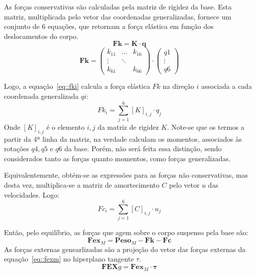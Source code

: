 As forças conservativas são calculadas pela matriz de rigidez da base. Esta
matriz, multiplicada pelo vetor das coordenadas generalizadas, fornece um
conjunto de 6 equações, que retornam a força elástica em função dos
deslocamentos do corpo.
%
\begin{equation}
	\mathbf{Fk} = \mathbf{K} \cdot \mathbf{q}
\end{equation}
\begin{equation}
	\mathbf{Fk} = \begin{pmatrix} 
    k_{11} & \dots 	& k_{16} \\
    \vdots & \ddots & \\
    k_{61} &        & k_{66} 
    \end{pmatrix} \cdot 
    \begin{pmatrix} 
    q1 \\ 
    \vdots \\ 
    q6 
    \end{pmatrix}
\end{equation}


Logo, a equação~\ref{eq::fki} calcula a força elástica $Fk$ na direção $i$
associada a cada coordenada generalizada $qi$:
%
\begin{equation} \label{eq::fki}
	Fk_i = \sum_{j=1}^{6} [K]_{i,j} \cdot q_j
\end{equation}
%
Onde $[K]_{i,j}$ é o elemento $i,j$ da matriz de rigidez $K$. Note-se que os
termos a partir da 4ª linha da matriz, na verdade calculam os momentos,
associados às rotações $q4, q5$ e $q6$ da base.
Porém, não será feita essa distinção, sendo considerados tanto as forças quanto
momentos, como forças generalizadas.

Equivalentemente, obtém-se as expressões para as forças não conservativas, mas
desta vez, multiplica-se a matriz de amortecimento $C$ pelo vetor $u$ das
velocidades. Logo:
%
\begin{equation} \label{eq::fci}
	Fc_i = \sum_{j=1}^{6} [C]_{i,j} \cdot u_j
\end{equation}
%

Então, pelo equilíbrio, as forças que agem sobre o corpo suspenso pela base são:
%
\begin{equation} \label{eq::fexm}
	\mathbf{Fex}_M = \mathbf{Peso}_M - \mathbf{Fk} - \mathbf{Fc}
\end{equation}
%
As forças externas genearlizadas são a projeção do vetor das forças externas da
equação~\ref{eq::fexm} no hiperplano tangente $\tau$.
%
\begin{equation}
	\mathbf{FEX}g = \mathbf{Fex}_M \cdot \boldsymbol{\tau}
\end{equation}
%

